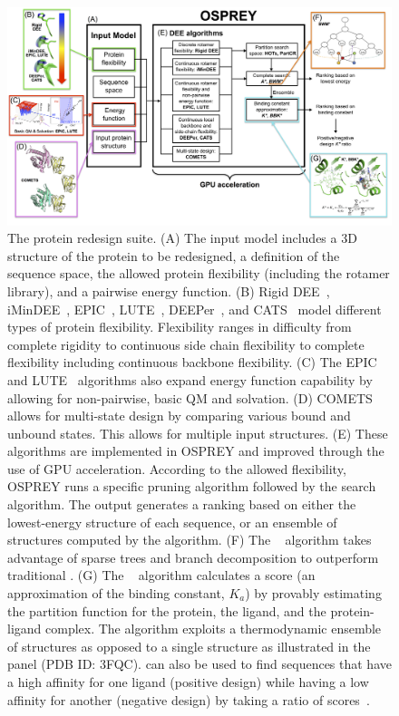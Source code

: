 \begin{figure}
\center
\includegraphics[width=6in]{figures/osprey_mantra.png}
 \vspace{-0.3in}%
\caption{The \osprey protein redesign suite. (A) The input model includes a 3D structure of the protein to be redesigned, a definition of the sequence space, the allowed protein flexibility (including the rotamer library), and a pairwise energy function. (B) Rigid DEE~\cite{DEE,DEE/A*}, iMinDEE~\cite{iMinDEE}, EPIC~\cite{EPIC}, LUTE~\cite{LUTE_RECOMB}, DEEPer~\cite{DEEPer}, and CATS~\cite{CATS} model different types of protein flexibility. Flexibility ranges in difficulty from complete rigidity to continuous side chain flexibility to complete flexibility including continuous backbone flexibility. (C) The EPIC~\cite{EPIC} and LUTE~\cite{LUTE_RECOMB} algorithms also expand energy function capability by allowing for non-pairwise, basic QM and solvation. (D) COMETS~\cite{COMETS} allows for multi-state design by comparing various bound and unbound states. This allows for multiple input structures. (E) These algorithms are implemented in OSPREY and improved through the use of GPU acceleration. According to the allowed flexibility, OSPREY runs a specific pruning algorithm followed by the \as search algorithm. The \as output generates a ranking based on either the lowest-energy structure of each sequence, or an ensemble of structures computed by the \ks algorithm. (F) The \bwmstar~\cite{BWM*} algorithm takes advantage of sparse trees and branch decomposition to outperform traditional \as. (G) The \ks~\cite{K*,minDEE} algorithm calculates a \ks score (an approximation of the binding constant, $K_a$) by provably estimating the partition function for the protein, the ligand, and the protein-ligand complex. The \ks algorithm exploits a thermodynamic ensemble of structures as opposed to a single structure as illustrated in the panel (PDB ID: 3FQC). \ks can also be used to find sequences that have a high affinity for one ligand (positive design) while having a low affinity for another (negative design) by taking a ratio of \ks scores~\cite{DHFR-PNAS,DHFR-PNAS2}. }
\label{flowchart}
\end{figure}

